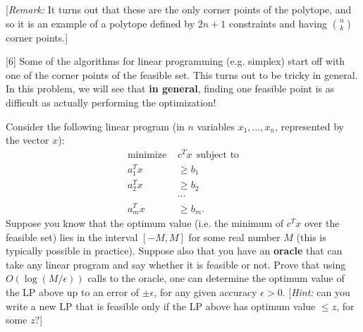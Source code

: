 \documentclass[addpoints, 11pt]{exam}
\begin{document}
\begin{questions}

    [{\em Remark:} It turns out that these are the only corner points of the polytope, and so it is an example of a polytope defined by $2n+1$ constraints and having $\binom{n}{k}$ corner points.]

  [6]
  Some of the algorithms for linear programming (e.g. simplex) start off with one of the corner points of the feasible set.  This turns out to be tricky in general. In this problem, we will see that {\bf in general}, finding one feasible point is as difficult as actually performing the optimization!

  Consider the following linear program (in $n$ variables $x_1, \dots, x_n$, represented by the vector $x$):
  \begin{align*}
    \text{minimize } & c^T x ~~\text{subject to} \\
    a_1^T x          & \ge b_1                   \\
    a_2^T x          & \ge b_2                   \\
                     & \cdots                    \\
    a_m^T x          & \ge b_m.
  \end{align*}
  Suppose you know that the optimum value (i.e. the minimum of $c^T x$ over the feasible set) lies in the interval $[-M, M]$ for some real number $M$ (this is typically possible in practice).  Suppose also that you have an {\bf oracle} that can take any linear program and say whether it is feasible or not.  Prove that using $O(\log (M/\epsilon))$ calls to the oracle, one can determine the optimum value of the LP above up to an error of $\pm \epsilon$, for any given accuracy $\epsilon > 0$.  [\emph{Hint: } can you write a new LP that is feasible only if the LP above has optimum value $\le z$, for some $z$?]

\end{questions}
\end{document}
